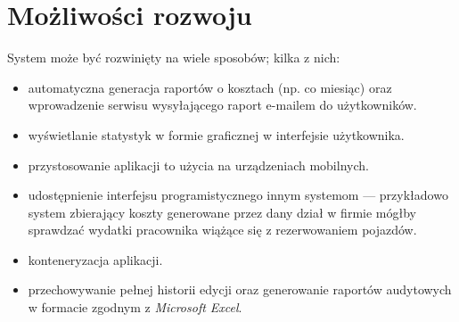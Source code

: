 \documentclass[eng,printmode,openany]{mgr}
\begin{document}
	\section{Możliwości rozwoju}
	System może być rozwinięty na wiele sposobów; kilka z nich:
	\begin{itemize}
		\item automatyczna generacja raportów o kosztach (np. co miesiąc) oraz wprowadzenie serwisu wysyłającego raport e-mailem do użytkowników.
		\item wyświetlanie statystyk w formie graficznej w interfejsie użytkownika.
		\item przystosowanie aplikacji to użycia na urządzeniach mobilnych.
		\item udostępnienie interfejsu programistycznego innym systemom — przykładowo system zbierający koszty generowane przez dany dział w firmie mógłby sprawdzać wydatki pracownika wiążące się z rezerwowaniem pojazdów.
		\item konteneryzacja aplikacji.
		\item przechowywanie pełnej historii edycji oraz generowanie raportów audytowych w formacie zgodnym z \textit{Microsoft Excel}.
	\end{itemize}
	
	
	
	
\end{document}
